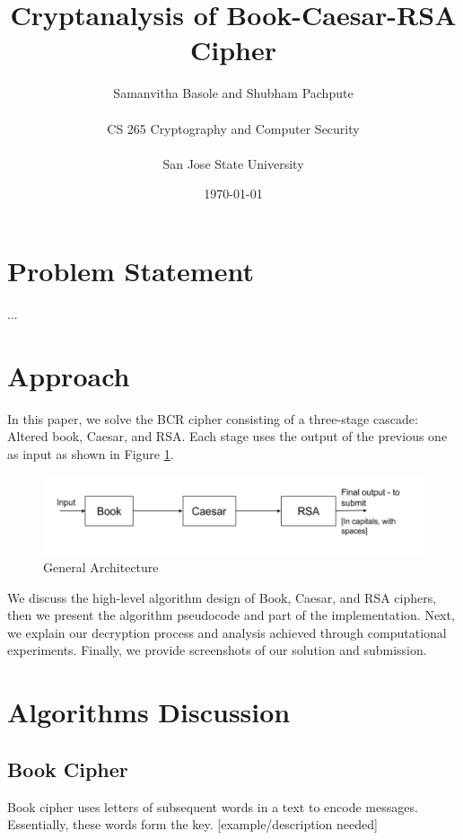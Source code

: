 \documentclass[12pt]{article}
\title{Cryptanalysis of Book-Caesar-RSA Cipher}
\author{Samanvitha Basole and Shubham Pachpute\\
\\
CS 265 Cryptography and Computer Security\\
\\
San Jose State University
}
\date{\today}
\begin{document}
\maketitle

\section{Problem Statement}
...


\section{Approach}
In this paper, we solve the BCR cipher consisting of a three-stage cascade: Altered book, Caesar, and RSA. Each stage uses the output of the previous one as input as shown in Figure \ref{fig:arch}.
\begin{figure}[h]
  \includegraphics[scale=0.8]{3_stage}
  \caption{General Architecture}
  \label{fig:arch}
\end{figure}
We discuss the high-level algorithm design of Book, Caesar, and RSA ciphers, then we present the algorithm pseudocode and part of the implementation. Next, we explain our decryption process and analysis achieved through computational experiments. Finally, we provide screenshots of our solution and submission.


\section{Algorithms Discussion}
\subsection{Book Cipher}
Book cipher uses letters of subsequent words in a text to encode messages. Essentially, these words form the key. 
[example/description needed]
\end{document}
